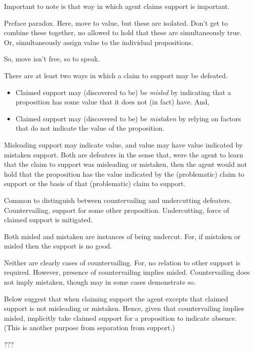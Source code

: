 \begin{note}
  \color{red}
  Important to note is that way in which agent claims support is important.

  Preface paradox.
  Here, move to value, but these are isolated.
  Don't get to combine these together, no allowed to hold that these are simultaneously true.
  Or, simultaneously assign value to the individual propositions.

  So, move isn't free, so to speak.
\end{note}

\begin{note}
  \begin{proposition}\label{prop:defs-for-CS}
    There are at least two ways in which a claim to support may be defeated.
      \begin{itemize}
      \item Claimed support may (discovered to be) be \emph{misled} by indicating that a proposition has some value that it does not (in fact) have. And,
      \item Claimed support may (discovered to be) be \emph{mistaken} by relying on factors that do not indicate the value of the proposition.
      \end{itemize}
      \vspace{-\topsep}\vspace{-\topsep}
  \end{proposition}
  Misleading support may indicate value, and value may have value indicated by mistaken support.
  Both are defeaters in the sense that, were the agent to learn that the claim to support was misleading or mistaken, then the agent would not hold that the proposition has the value indicated by the (problematic) claim to support or the basis of that (problematic) claim to support.

  Common to distinguish between countervailing and undercutting defeaters.
  Countervailing, support for some other proposition.
  Undercutting, force of claimed support is mitigated.

  Both misled and mistaken are instances of being undercut.
  For, if mistaken or misled then the support is no good.

  Neither are clearly cases of countervailing.
  For, no relation to other support is required.
  However, presence of countervailing implies misled.
  Countervailing does not imply mistaken, though may in some cases demonstrate so.

  Below suggest that when claiming support the agent excepts that claimed support is not misleading or mistaken.
  Hence, given that countervailing implies misled, implicitly take claimed support for a proposition to indicate absence.
  (This is another purpose from separation from support.)

  ???
\end{note}

